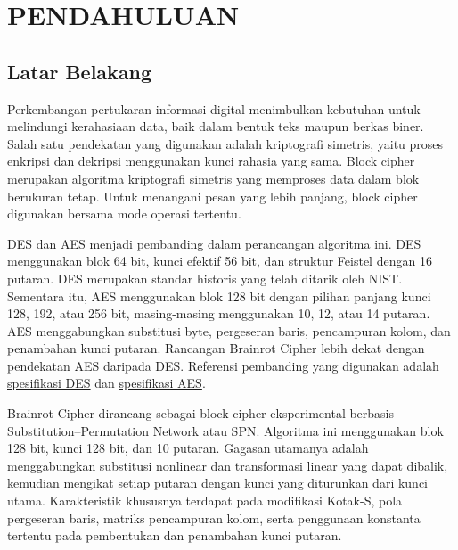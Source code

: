 \chapter{PENDAHULUAN}

\section{Latar Belakang}

Perkembangan pertukaran informasi digital menimbulkan kebutuhan untuk melindungi kerahasiaan data, baik dalam bentuk teks maupun berkas biner. Salah satu pendekatan yang digunakan adalah kriptografi simetris, yaitu proses enkripsi dan dekripsi menggunakan kunci rahasia yang sama. Block cipher merupakan algoritma kriptografi simetris yang memproses data dalam blok berukuran tetap. Untuk menangani pesan yang lebih panjang, block cipher digunakan bersama mode operasi tertentu.

DES dan AES menjadi pembanding dalam perancangan algoritma ini. DES menggunakan blok 64 bit, kunci efektif 56 bit, dan struktur Feistel dengan 16 putaran. DES merupakan standar historis yang telah ditarik oleh NIST. Sementara itu, AES menggunakan blok 128 bit dengan pilihan panjang kunci 128, 192, atau 256 bit, masing-masing menggunakan 10, 12, atau 14 putaran. AES menggabungkan substitusi byte, pergeseran baris, pencampuran kolom, dan penambahan kunci putaran. Rancangan Brainrot Cipher lebih dekat dengan pendekatan AES daripada DES. Referensi pembanding yang digunakan adalah \href{https://csrc.nist.gov/files/pubs/fips/46-3/final/docs/fips46-3.pdf}{spesifikasi DES} dan \href{https://nvlpubs.nist.gov/nistpubs/FIPS/NIST.FIPS.197-upd1.pdf}{spesifikasi AES}.

Brainrot Cipher dirancang sebagai block cipher eksperimental berbasis Substitution–Permutation Network atau SPN. Algoritma ini menggunakan blok 128 bit, kunci 128 bit, dan 10 putaran. Gagasan utamanya adalah menggabungkan substitusi nonlinear dan transformasi linear yang dapat dibalik, kemudian mengikat setiap putaran dengan kunci yang diturunkan dari kunci utama. Karakteristik khususnya terdapat pada modifikasi Kotak-S, pola pergeseran baris, matriks pencampuran kolom, serta penggunaan konstanta tertentu pada pembentukan dan penambahan kunci putaran.


